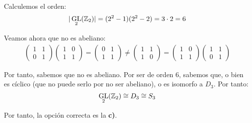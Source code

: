 \documentclass[12pt]{article}
\DeclareMathOperator{\GL}{GL}
\begin{document}
\begin{ejercicio}
\begin{enumerate}
            Calculemos el orden:
            \begin{equation*}
                |\GL_2(\bb{Z}_2)|=(2^2-1)(2^2-2)=3\cdot 2=6
            \end{equation*}

            Veamos ahora que no es abeliano:
            \begin{align*}
                \begin{pmatrix}
                    1 & 1\\
                    0 & 1
                \end{pmatrix}
                \begin{pmatrix}
                    1 & 0\\
                    1 & 1
                \end{pmatrix}=
                \begin{pmatrix}
                    0 & 1\\
                    1 & 1
                \end{pmatrix}\neq
                \begin{pmatrix}
                    1 & 1\\
                    1 & 0
                \end{pmatrix}=
                \begin{pmatrix}
                    1 & 0\\
                    1 & 1
                \end{pmatrix}
                \begin{pmatrix}
                    1 & 1\\
                    0 & 1
                \end{pmatrix}
            \end{align*}

            Por tanto, sabemos que no es abeliano. Por ser de orden $6$, sabemos que, o bien es cíclico (que no puede serlo por no ser abeliano), o es isomorfo a $D_3$. Por tanto:
            \begin{equation*}
                \GL_2(\bb{Z}_2)\cong D_3\cong S_3
            \end{equation*}

            Por tanto, la opción correcta es la \textbf{c)}.
                
        \end{enumerate}
    \end{ejercicio}
\end{document}
